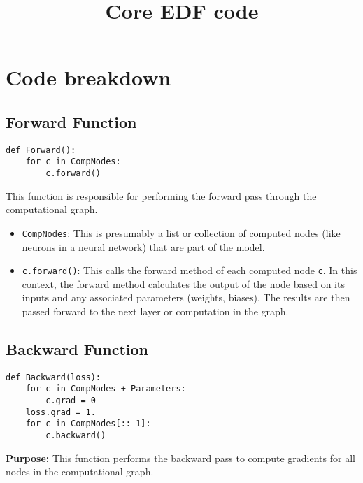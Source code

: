 \documentclass{article}
\begin{document}
\title{Core EDF code}

\maketitle

\section{Code breakdown}

\subsection{Forward Function}
\begin{verbatim}
def Forward():
    for c in CompNodes: 
        c.forward()
\end{verbatim}

This function is responsible for performing the forward pass through the computational graph. 

\begin{itemize}
    \item \texttt{CompNodes}: This is presumably a list or collection of computed nodes (like neurons in a neural network) that are part of the model.
    \item \texttt{c.forward()}: This calls the forward method of each computed node \texttt{c}. In this context, the forward method calculates the output of the node based on its inputs and any associated parameters (weights, biases). The results are then passed forward to the next layer or computation in the graph.
\end{itemize}

\subsection{Backward Function}
\begin{verbatim}
def Backward(loss):
    for c in CompNodes + Parameters: 
        c.grad = 0
    loss.grad = 1.
    for c in CompNodes[::-1]: 
        c.backward()
\end{verbatim}

\textbf{Purpose:} This function performs the backward pass to compute gradients for all nodes in the computational graph. 
\end{document}
